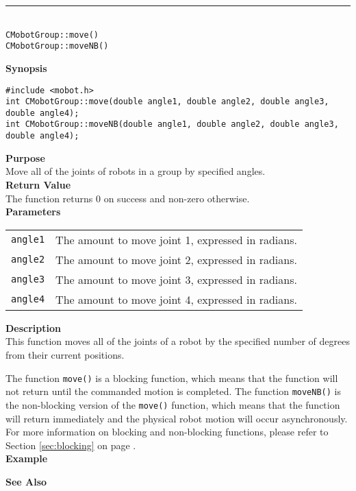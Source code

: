 \noindent
\vspace{5pt}
\rule{4.5in}{0.015in}\\
\noindent
{\LARGE \texttt{CMobotGroup::move()}}\\
{\LARGE \texttt{CMobotGroup::moveNB()}}\\
{}

\noindent
{\bf Synopsis}
\begin{verbatim}
#include <mobot.h>
int CMobotGroup::move(double angle1, double angle2, double angle3, double angle4);
int CMobotGroup::moveNB(double angle1, double angle2, double angle3, double angle4);
\end{verbatim}

\noindent
{\bf Purpose}\\
Move all of the joints of robots in a group by specified angles.\\

\noindent
{\bf Return Value}\\
The function returns 0 on success and non-zero otherwise.\\

\noindent
{\bf Parameters}\\
\vspace{-0.1in}
\begin{description}
\item               
\begin{tabular}{p{15 mm}p{105 mm}}
\texttt{angle1} & The amount to move joint 1, expressed in radians. \\
\texttt{angle2} & The amount to move joint 2, expressed in radians. \\
\texttt{angle3} & The amount to move joint 3, expressed in radians. \\
\texttt{angle4} & The amount to move joint 4, expressed in radians. \\
\end{tabular}
\end{description}
\noindent
{\bf Description}\\
This function moves all of the joints of a robot by the specified number of degrees
from their current positions. 

The function \texttt{move()} is a blocking function,
which means that the function will not return until the commanded motion is 
completed. The function \texttt{moveNB()} is the non-blocking version of
the \texttt{move()} function, which means that the function will return
immediately and the physical robot motion will occur asynchronously. For 
more information on blocking and non-blocking functions, please refer to 
Section \ref{sec:blocking} on page \pageref{sec:blocking}.\\

\noindent
{\bf Example}\\
\noindent

\noindent
{\bf See Also}\\


